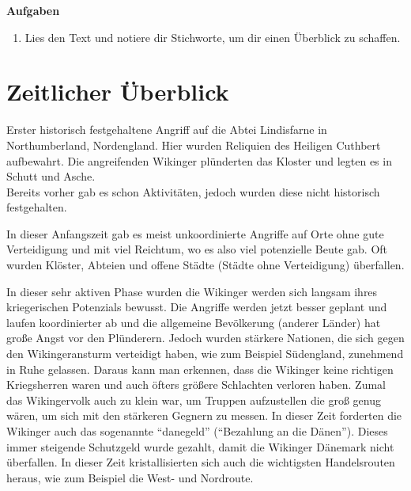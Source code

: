 \documentclass[12pt,a4paper,ngerman,openany]{book}
\newcommand{\aufgaben}[1]{
  \begin{tcolorbox}
    \textbf{Aufgaben}
    \begin{enumerate}
      #1
    \end{enumerate}
  \end{tcolorbox}
}
\newcommand{\erklaer}[2]{\leavevmode\marginpar{\footnotesize \textbf{#1:}\\#2}\ignorespaces}
\begin{document}
\aufgaben {
  \item Lies den Text und notiere dir Stichworte, um dir einen Überblick zu schaffen.
}

\pagebreak

\section{Zeitlicher Überblick}


\begin{tcolorbox}[sharp corners, title=08. Juni 793]
Erster historisch festgehaltene Angriff auf die Abtei Lindisfarne in Northumberland, Nordengland. Hier wurden Reliquien des Heiligen Cuthbert aufbewahrt. Die angreifenden Wikinger plünderten das Kloster und legten es in Schutt und Asche.\\
Bereits vorher gab es schon Aktivitäten, jedoch wurden diese nicht historisch festgehalten.
\end{tcolorbox}

\begin{tcolorbox}[sharp corners, title=Ungefähr 800 bis 850]
In dieser Anfangszeit gab es meist unkoordinierte Angriffe auf Orte ohne gute Verteidigung und mit viel Reichtum, wo es also viel potenzielle Beute gab. Oft wurden Klöster, Abteien und offene Städte (Städte ohne Verteidigung) überfallen.
\end{tcolorbox}

\erklaer{Schutzgeld}{abc} %

\begin{tcolorbox}[sharp corners, title=Ungefähr 850 bis 900]
In dieser sehr aktiven Phase wurden die Wikinger werden sich langsam ihres kriegerischen Potenzials bewusst. Die Angriffe werden jetzt besser geplant und laufen koordinierter ab und die allgemeine Bevölkerung (anderer Länder) hat große Angst vor den Plünderern.
Jedoch wurden stärkere Nationen, die sich gegen den Wikingeransturm verteidigt haben, wie zum Beispiel Südengland, zunehmend in Ruhe gelassen. Daraus kann man erkennen, dass die Wikinger keine richtigen Kriegsherren waren und auch öfters größere Schlachten verloren haben. Zumal das Wikingervolk auch zu klein war, um Truppen aufzustellen die groß genug wären, um sich mit den stärkeren Gegnern zu messen.
In dieser Zeit forderten die Wikinger auch das sogenannte “danegeld” (“Bezahlung an die Dänen”). Dieses immer steigende Schutzgeld wurde gezahlt, damit die Wikinger Dänemark nicht überfallen.
In dieser Zeit kristallisierten sich auch die wichtigsten Handelsrouten heraus, wie zum Beispiel die West- und Nordroute.
\end{tcolorbox}
\end{document}
